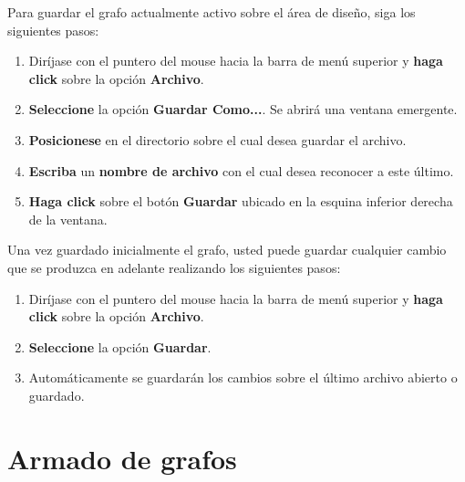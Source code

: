 \documentclass{book}
\begin{document}
Para guardar el grafo actualmente activo sobre el área de diseño, siga los siguientes pasos:
\medskip

\begin{enumerate}
	\itemsep=8pt \topsep=0pt \partopsep=0pt \parskip=0pt \parsep=0pt

	\item Diríjase con el puntero del mouse hacia la barra de menú superior y \textbf{haga click} sobre la opción \textbf{Archivo}.

	\item \textbf{Seleccione} la opción \textbf{Guardar Como...}. Se abrirá una ventana emergente.

	\item \textbf{Posicionese} en el directorio sobre el cual desea guardar el archivo.

	\item \textbf{Escriba} un \textbf{nombre de archivo} con el cual desea reconocer a este último.

	\item \textbf{Haga click} sobre el botón \textbf{Guardar} ubicado en la esquina inferior derecha de la ventana.

\end{enumerate}
\medskip


Una vez guardado inicialmente el grafo, usted puede guardar cualquier cambio que se produzca en adelante realizando los siguientes pasos:

\begin{enumerate}
	\itemsep=8pt \topsep=0pt \partopsep=0pt \parskip=0pt \parsep=0pt

	\item Diríjase con el puntero del mouse hacia la barra de menú superior y \textbf{haga click} sobre la opción \textbf{Archivo}.

	\item \textbf{Seleccione} la opción \textbf{Guardar}.

	\item Automáticamente se guardarán los cambios sobre el último archivo abierto o guardado.

\end{enumerate}
\medskip




%
%
\chapter{Armado de grafos}

\end{document}
